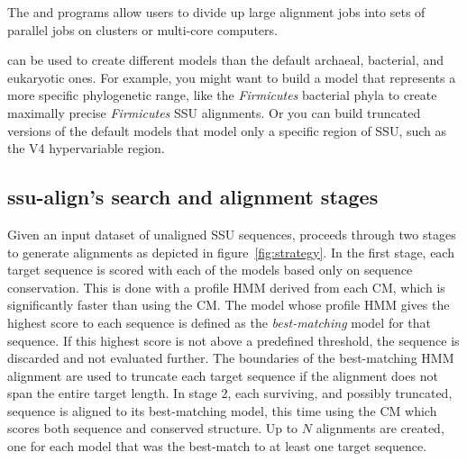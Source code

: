 The  and  programs allow users to
divide up large alignment jobs into sets of parallel
 jobs on clusters or multi-core computers.

 can be used to create different models than the
default archaeal, bacterial, and eukaryotic ones. For example, you
might want to build a model that represents a more specific
phylogenetic range, like the \emph{Firmicutes} bacterial phyla to
create maximally precise \emph{Firmicutes} SSU alignments. Or you can build
truncated versions of the default models that model only a
specific region of SSU, such as the V4 hypervariable region.

\subsection{ssu-align's search and alignment stages}

Given an input dataset of unaligned SSU sequences, 
proceeds through two stages to generate alignments as depicted in
figure~\ref{fig:strategy}.  
In the first stage, each target sequence is scored with each of the
models based only on sequence conservation. This is done with a
profile HMM derived from each CM, which is significantly faster than
using the CM\@.  The model whose profile HMM gives the highest score to
each sequence is defined as the \emph{best-matching} model for that
sequence. If this highest score is not above a predefined threshold,
the sequence is discarded and not evaluated further. The boundaries of
the best-matching HMM alignment are used to truncate each target
sequence if the alignment does not span the entire target length.  In
stage 2, each surviving, and possibly truncated, sequence is aligned
to its best-matching model, this time using the CM which scores
both sequence and conserved structure. Up to $N$ alignments are
created, one for each model that was the best-match to at least one
target sequence.


